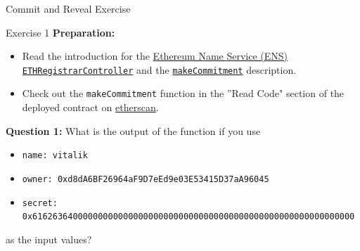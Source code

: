 \documentclass[]{beamer}
\begin{document}
\begin{frame}{Commit and Reveal Exercise}
	
	\begin{exercise}{Exercise 1}
		\textbf{Preparation:}
		\begin{itemize}
			\item Read the introduction for the \href{https://docs.ens.domains/contract-api-reference/.eth-permanent-registrar/controller}{\link Ethereum Name Service (ENS) \texttt{ETHRegistrarController}} and the \href{https://docs.ens.domains/contract-api-reference/.eth-permanent-registrar/controller\#calculate-commitment-hash}{\link \texttt{makeCommitment}} description.
			\item Check out the \texttt{makeCommitment} function in the ''Read Code" section of the deployed contract on \href{https://etherscan.io/address/0x283af0b28c62c092c9727f1ee09c02ca627eb7f5\#readContract}{\link etherscan}.
		\end{itemize}
		
		\textbf{Question 1:} What is the output of the function if you use
					
		\begin{itemize}
			\item \texttt{name: vitalik}
			\item \texttt{owner: 0xd8dA6BF26964aF9D7eEd9e03E53415D37aA96045}
			\item \texttt{secret: 0x6162636400000000000000000000000000000000000000000000000000000000}
		\end{itemize}
		
		as the input values?
					
	\end{exercise}	
\end{frame}
\end{document}
